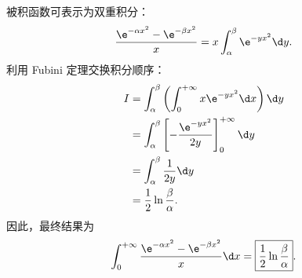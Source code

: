 \begin{solution}

    被积函数可表示为双重积分：
    \begin{equation}
        \frac{\e^{-\alpha x^2} - \e^{-\beta x^2}}{x} = x \int_{\alpha}^{\beta} \e^{-y x^2} \d y.
    \end{equation}
    利用 Fubini 定理交换积分顺序：
    \begin{equation}
        \begin{aligned}
            I & = \int_{\alpha}^{\beta} \left( \int_0^{+\infty} x \e^{-y x^2} \d x \right) \d y \\
              & = \int_{\alpha}^{\beta} \left[ -\frac{\e^{-yx^2}}{2y} \right]_0^{+\infty} \d y  \\
              & = \int_{\alpha}^{\beta} \frac{1}{2y} \d y                                       \\
              & = \frac{1}{2} \ln \frac{\beta}{\alpha}.
        \end{aligned}
    \end{equation}
    因此，最终结果为
    \begin{equation}
        \int_0^{+\infty} \frac{\e^{-\alpha x^2} - \e^{-\beta x^2}}{x} \d x = \boxed{\frac{1}{2} \ln \frac{\beta}{\alpha}}.
    \end{equation}



\end{solution}
